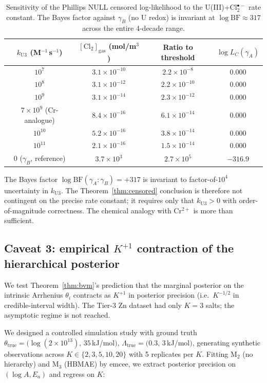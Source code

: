 \documentclass[11pt]{article}
\theoremstyle{definition}
\theoremstyle{remark}
\newcommand{\HBMAE}{HBMAE\xspace}
\begin{document}
\begin{table}[ht]
\centering
\caption{Sensitivity of the Phillips NULL censored log-likelihood to the U(III)+Cl$_2^{\bullet-}$
rate constant. The Bayes factor against $\gamma_B$ (no U redox) is invariant at
$\log\mathrm{BF}\approx 317$ across the entire 4-decade range.}
\label{tab:caveat2}
\begin{tabular}{c c c c}
\toprule
$k_{\mathrm{U3}}$ (M$^{-1}\,$s$^{-1}$) & $[\mathrm{Cl}_2]_{\text{gas}}$ (mol/m$^3$) & Ratio to threshold & $\log L_C(\gamma_A)$ \\
\midrule
$10^{7}$ & $3.1\times 10^{-10}$ & $2.2\times 10^{-8}$ & $0.000$ \\
$10^{8}$ & $3.1\times 10^{-12}$ & $2.2\times 10^{-10}$ & $0.000$ \\
$10^{9}$ & $3.1\times 10^{-14}$ & $2.3\times 10^{-12}$ & $0.000$ \\
$7\times 10^{9}$ (Cr-analogue) & $8.4\times 10^{-16}$ & $6.1\times 10^{-14}$ & $0.000$ \\
$10^{10}$ & $5.2\times 10^{-16}$ & $3.8\times 10^{-14}$ & $0.000$ \\
$10^{11}$ & $2.1\times 10^{-16}$ & $1.5\times 10^{-14}$ & $0.000$ \\
\midrule
0 ($\gamma_B$, reference) & $3.7\times 10^{3}$ & $2.7\times 10^{5}$ & $-316.9$ \\
\bottomrule
\end{tabular}
\end{table}

The Bayes factor $\log\mathrm{BF}(\gamma_A:\gamma_B) = +317$ is invariant to
factor-of-$10^4$ uncertainty in $k_{\mathrm{U3}}$. The Theorem~\ref{thm:censored}
conclusion is therefore not contingent on the precise rate constant; it requires only
that $k_{\mathrm{U3}} > 0$ with order-of-magnitude correctness. The chemical analogy
with Cr$^{2+}$ is more than sufficient.

\subsection{Caveat 3: empirical $K^{+1}$ contraction of the hierarchical posterior}
\label{sec:caveat3}

We test Theorem~\ref{thm:bvm}'s prediction that the marginal posterior on the
intrinsic Arrhenius $\theta_i$ contracts as $K^{+1}$ in posterior precision (i.e.\
$K^{-1/2}$ in credible-interval width). The Tier-3 Zn dataset had only $K=3$ salts;
the asymptotic regime is not reached.

We designed a controlled simulation study with ground truth
$\theta_{\text{true}} = (\log(2\times 10^{13}),\, 35\,$kJ/mol$)$,
$\Lambda_{\text{true}} = (0.3,\, 3\,$kJ/mol$)$, generating synthetic observations
across $K \in \{2,3,5,10,20\}$ with 5 replicates per $K$. Fitting M$_2$ (no hierarchy)
and M$_3$ (\HBMAE) by emcee, we extract posterior precision on $(\log A, E_a)$ and
regress on $K$:
\end{document}
